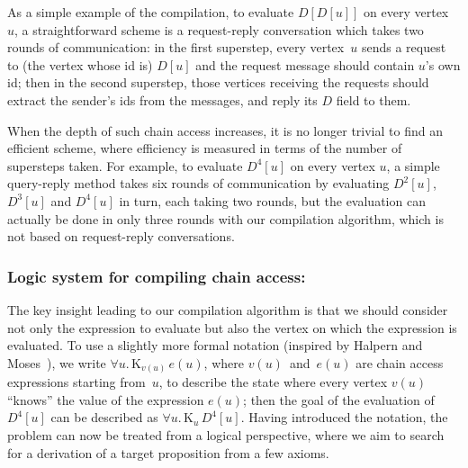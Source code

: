 \documentclass{sokendai_thesis} %
\newcommand{\knows}[2]{\mathrm K_{#1}\,{#2}}
\begin{document}
As a simple example of the compilation, to evaluate $D[D[u]]$ on every vertex~$u$, a straightforward scheme is a request-reply conversation which takes two rounds of communication:
in the first superstep, every vertex~$u$ sends a request to (the vertex whose id is) $D[u]$ and the request message should contain $u$'s own id;
then in the second superstep, those vertices receiving the requests should extract the sender's ids from the messages, and reply its $D$ field to them.

When the depth of such chain access increases, it is no longer trivial to find an efficient scheme, where efficiency is measured in terms of the number of supersteps taken.
For example, to evaluate $D^4[u]$ on every vertex $u$, a simple query-reply method takes six rounds of communication by evaluating $D^2[u]$, $D^3[u]$ and $D^4[u]$ in turn, each taking two rounds, but the evaluation can actually be done in only three rounds with our compilation algorithm, which is not based on request-reply conversations.

\subsubsection{Logic system for compiling chain access:}
The key insight leading to our compilation algorithm is that we should consider not only the expression to evaluate but also the vertex on which the expression is evaluated.
To use a slightly more formal notation (inspired by Halpern and Moses~\cite{Halpern-common-knowledge}), we write $\forall u.\,\knows{v(u)}{e(u)}$, where $v(u)$~and~$e(u)$ are chain access expressions starting from~$u$, to describe the state where every vertex $v(u)$ ``knows'' the value of the expression $e(u)$; then the goal of the evaluation of $D^4[u]$ can be described as $\forall u.\,\knows{u}{D^4[u]}$.
Having introduced the notation, the problem can now be treated from a logical perspective, where we aim to search for a derivation of a target proposition from a few axioms.
\end{document}
